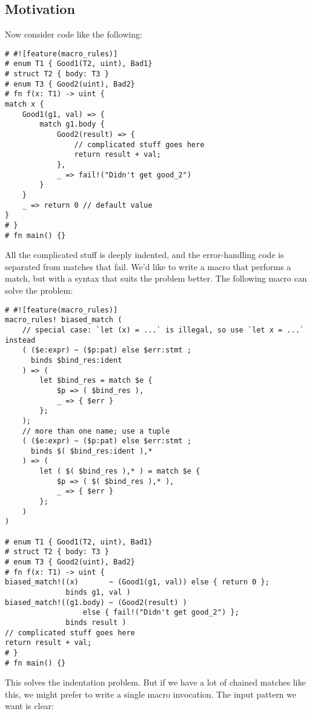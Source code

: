 \documentclass[]{article}
\begin{document}
\subsection{Motivation}\label{motivation}

Now consider code like the following:

\begin{verbatim}
# #![feature(macro_rules)]
# enum T1 { Good1(T2, uint), Bad1}
# struct T2 { body: T3 }
# enum T3 { Good2(uint), Bad2}
# fn f(x: T1) -> uint {
match x {
    Good1(g1, val) => {
        match g1.body {
            Good2(result) => {
                // complicated stuff goes here
                return result + val;
            },
            _ => fail!("Didn't get good_2")
        }
    }
    _ => return 0 // default value
}
# }
# fn main() {}
\end{verbatim}

All the complicated stuff is deeply indented, and the error-handling
code is separated from matches that fail. We'd like to write a macro
that performs a match, but with a syntax that suits the problem better.
The following macro can solve the problem:

\begin{verbatim}
# #![feature(macro_rules)]
macro_rules! biased_match (
    // special case: `let (x) = ...` is illegal, so use `let x = ...` instead
    ( ($e:expr) ~ ($p:pat) else $err:stmt ;
      binds $bind_res:ident
    ) => (
        let $bind_res = match $e {
            $p => ( $bind_res ),
            _ => { $err }
        };
    );
    // more than one name; use a tuple
    ( ($e:expr) ~ ($p:pat) else $err:stmt ;
      binds $( $bind_res:ident ),*
    ) => (
        let ( $( $bind_res ),* ) = match $e {
            $p => ( $( $bind_res ),* ),
            _ => { $err }
        };
    )
)

# enum T1 { Good1(T2, uint), Bad1}
# struct T2 { body: T3 }
# enum T3 { Good2(uint), Bad2}
# fn f(x: T1) -> uint {
biased_match!((x)       ~ (Good1(g1, val)) else { return 0 };
              binds g1, val )
biased_match!((g1.body) ~ (Good2(result) )
                  else { fail!("Didn't get good_2") };
              binds result )
// complicated stuff goes here
return result + val;
# }
# fn main() {}
\end{verbatim}

This solves the indentation problem. But if we have a lot of chained
matches like this, we might prefer to write a single macro invocation.
The input pattern we want is clear:
\end{document}
